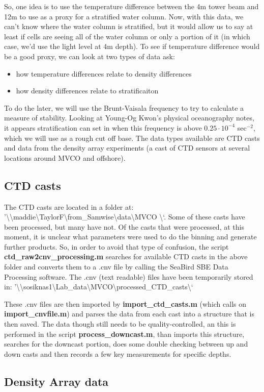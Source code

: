 \documentclass[11pt]{article}
\begin{document}
So, one idea is to use the temperature difference between the 4m tower beam and 12m to use as a proxy for a stratified water column. Now, with this data, we can't know where the water column is stratified, but it would allow us to say at least if cells are seeing all of the water column or only a portion of it (in which case, we'd use the light level at 4m depth). To see if temperature difference would be a good proxy, we can look at two types of data ask:
\begin{itemize}
\item how temperature differences relate to density differences
\item how density differences relate to stratificaiton
\end{itemize}

To do the later, we will use the Brunt-Vaisala frequency to try to calculate a measure of stability. Looking at Young-Og Kwon's physical oceanography notes, it appears stratification can set in when this frequency is above $0.25 \cdot 10^{-4}$ sec$^{-2}$, which we will use as a rough cut off base. The data types available are CTD casts and data from the density array experiments (a cast of CTD sensors at several locations around MVCO and offshore).

 \subsection{CTD casts}

The CTD casts are located in a folder at: '\textbackslash \textbackslash maddie\textbackslash TaylorF\textbackslash from\_Samwise\textbackslash data\textbackslash MVCO \textbackslash`. Some of these casts have been processed, but many have not. Of the casts that were processed, at this moment, it is unclear what parameters were used to do the binning and generate further products. So, in order to avoid that type of confusion, the script \textbf{ctd\_raw2cnv\_processing.m} searches for available CTD casts in the above folder and converts them to a .cnv file by calling the SeaBird SBE Data Processing software. The .cnv (text readable) files have been temporarily stored in: '\textbackslash \textbackslash sosiknas1\textbackslash Lab\_data\textbackslash MVCO\textbackslash processed\_CTD\_casts\textbackslash`

These .cnv files are then imported by \textbf{import\_ctd\_casts.m} (which calls on \textbf{import\_cnvfile.m}) and parses the data from each cast into a structure that is then saved. The data though still needs to be quality-controlled, an this is performed in the script \textbf{process\_downcast.m}, than imports this structure, searches for the downcast portion, does some double checking between up and down casts and then records a few key measurements for specific depths. 
\subsection{Density Array data}
\end{document}
